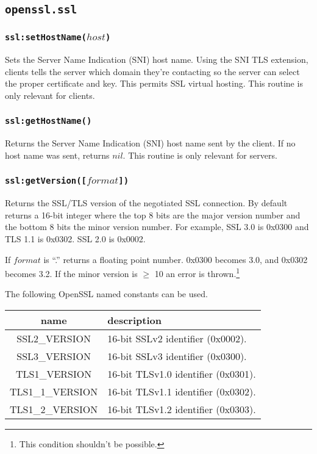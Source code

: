 \documentclass[11pt, oneside]{memoir}
\newcommand*{\fn}[1]{\texttt{#1}\xspace}
\newcounter{toccols}
\newenvironment{Module}[1]{
	\subsection{\texttt{#1}}
	\addtocontents{toc}{
		\protect\begin{multicols}{\value{toccols}}
	}
}{
	\addtocontents{toc}{\protect\end{multicols}}
}
\begin{document}
\begin{Module}{openssl.ssl}
\subsubsection[\fn{ssl:setHostName}]{\fn{ssl:setHostName($host$)}}

Sets the Server Name Indication (SNI) host name. Using the SNI TLS extension, clients tells the server which domain they're contacting so the server can select the proper certificate and key. This permits SSL virtual hosting. This routine is only relevant for clients.

\subsubsection[\fn{ssl:getHostName}]{\fn{ssl:getHostName()}}

Returns the Server Name Indication (SNI) host name sent by the client. If no host name was sent, returns $nil$. This routine is only relevant for servers.

\subsubsection[\fn{ssl:getVersion}]{\fn{ssl:getVersion([$format$])}}

Returns the SSL/TLS version of the negotiated SSL connection. By default returns a 16-bit integer where the top 8 bits are the major version number and the bottom 8 bits the minor version number. For example, SSL 3.0 is 0x0300 and TLS 1.1 is 0x0302. SSL 2.0 is 0x0002.

If $format$ is ``.'' returns a floating point number. 0x0300 becomes 3.0, and 0x0302 becomes 3.2. If the minor version is $\geq$ 10 an error is thrown.\footnote{This condition shouldn't be possible.}

The following OpenSSL named constants can be used.

\begin{tabular}{ c | l }
name & description \\\hline
SSL2\_VERSION & 16-bit SSLv2 identifier (0x0002).  \\
SSL3\_VERSION & 16-bit SSLv3 identifier (0x0300).  \\
TLS1\_VERSION & 16-bit TLSv1.0 identifier (0x0301).  \\
TLS1\_1\_VERSION & 16-bit TLSv1.1 identifier (0x0302).  \\
TLS1\_2\_VERSION & 16-bit TLSv1.2 identifier (0x0303).  \\
\end{tabular}


\end{Module}
\end{document}
